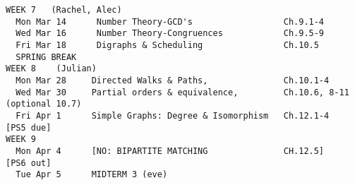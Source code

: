\documentclass[quiz]{mcs}
\begin{document}
\begin{staffnotes}
\begin{verbatim}
WEEK 7   (Rachel, Alec)
  Mon Mar 14      Number Theory-GCD's                  Ch.9.1-4    
  Wed Mar 16      Number Theory-Congruences            Ch.9.5-9  
  Fri Mar 18      Digraphs & Scheduling                Ch.10.5
  SPRING BREAK
WEEK 8    (Julian)
  Mon Mar 28     Directed Walks & Paths,               Ch.10.1-4
  Wed Mar 30     Partial orders & equivalence,         Ch.10.6, 8-11 (optional 10.7)
  Fri Apr 1      Simple Graphs: Degree & Isomorphism   Ch.12.1-4        [PS5 due]
WEEK 9
  Mon Apr 4      [NO: BIPARTITE MATCHING               CH.12.5]         [PS6 out]
  Tue Apr 5      MIDTERM 3 (eve) 
\end{verbatim}
\end{staffnotes}


\end{document}
